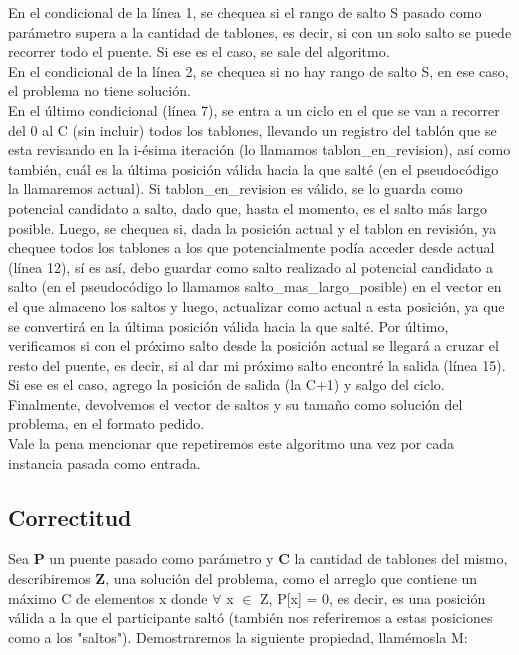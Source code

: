 \documentclass[10pt,a4paper]{article}
\begin{document}
\noindent En el condicional de la línea 1, se chequea si el rango de salto S pasado como parámetro supera a la cantidad de tablones, es decir, si con un solo salto se puede recorrer todo el puente. Si ese es el caso, se sale del algoritmo.\\
En el condicional de la línea 2, se chequea si no hay rango de salto S, en ese caso, el problema no tiene solución.\\
En el último condicional (línea 7), se entra a un ciclo en el que se van a recorrer del 0 al C (sin incluir) todos los tablones, llevando un registro del tablón que se esta revisando en la i-ésima iteración (lo llamamos tablon\_en\_revision), así como también, cuál es la última posición válida hacia la que salté (en el pseudocódigo la llamaremos actual). Si tablon\_en\_revision es válido, se lo guarda como potencial candidato a salto, dado que, hasta el momento, es el salto más largo posible. Luego, se chequea si, dada la posición actual y el tablon en revisión, ya chequee todos los tablones a los que potencialmente podía acceder desde actual (línea 12), sí es así, debo guardar como salto realizado al potencial candidato a salto (en el pseudocódigo lo llamamos salto\_mas\_largo\_posible) en el vector en el que almaceno los saltos y luego, actualizar como actual a esta posición, ya que se convertirá en la última posición válida hacia la que salté. Por último, verificamos si con el próximo salto desde la posición actual se llegará a cruzar el resto del puente, es decir, si al dar mi próximo salto encontré la salida (línea 15). Si ese es el caso, agrego la posición de salida (la C+1) y salgo del ciclo.\\
Finalmente, devolvemos el vector de saltos y su tamaño como solución del problema, en el formato pedido.\\
Vale la pena mencionar que repetiremos este algoritmo una vez por cada instancia pasada como entrada.\\



\subsection{Correctitud}

Sea \textbf{P} un puente pasado como par\'ametro y \textbf{C} la cantidad de tablones del mismo, describiremos \textbf{Z}, una soluci\'on del problema, como el arreglo que contiene un máximo C de elementos x donde $\forall$ x $\in$ Z, P[x] = 0, es decir, es una posici\'on v\'alida a la que el participante salt\'o (tambi\'en nos referiremos a estas posiciones como a los "saltos").
Demostraremos la siguiente propiedad, llam\'emosla M:\\
\end{document}
